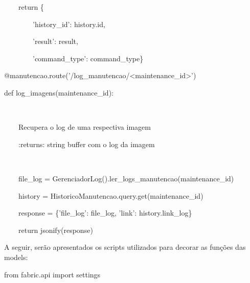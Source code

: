 {\ttfamily\color[rgb]{0.10980392,0.10980392,0.10980392}
    \ \ \ \ return \{}

{\ttfamily\color[rgb]{0.10980392,0.10980392,0.10980392}
    \ \ \ \ \ \ \ \ {}'history\_id': history.id,}

{\ttfamily\color[rgb]{0.10980392,0.10980392,0.10980392}
    \ \ \ \ \ \ \ \ {}'result': result,}

{\ttfamily\color[rgb]{0.10980392,0.10980392,0.10980392}
    \ \ \ \ \ \ \ \ {}'command\_type': command\_type\}}


    \bigskip


    \bigskip

{\ttfamily\color[rgb]{0.10980392,0.10980392,0.10980392}
    @manutencao.route('/log\_manutencao/{\textless}maintenance\_id{\textgreater}')}

{\ttfamily\color[rgb]{0.10980392,0.10980392,0.10980392}
    def log\_imagens(maintenance\_id):}

{\ttfamily\color[rgb]{0.10980392,0.10980392,0.10980392}
    \ \ \ \ {\textquotedbl}{\textquotedbl}{\textquotedbl}}

{\ttfamily\color[rgb]{0.10980392,0.10980392,0.10980392}
    \ \ \ \ Recupera o log de uma respectiva imagem}


    \bigskip

{\ttfamily\color[rgb]{0.10980392,0.10980392,0.10980392}
    \ \ \ \ :returns: string buffer com o log da imagem}

{\ttfamily\color[rgb]{0.10980392,0.10980392,0.10980392}
    \ \ \ \ {\textquotedbl}{\textquotedbl}{\textquotedbl}}

{\ttfamily\color[rgb]{0.10980392,0.10980392,0.10980392}
    \ \ \ \ file\_log = GerenciadorLog().ler\_logs\_manutencao(maintenance\_id)}

{\ttfamily\color[rgb]{0.10980392,0.10980392,0.10980392}
    \ \ \ \ history = HistoricoManutencao.query.get(maintenance\_id)}


    \bigskip

{\ttfamily\color[rgb]{0.10980392,0.10980392,0.10980392}
    \ \ \ \ response = \{'file\_log': file\_log, 'link': history.link\_log\}}

{\ttfamily\color[rgb]{0.10980392,0.10980392,0.10980392}
    \ \ \ \ return jsonify(response)}


    \bigskip

{\color{black}
    A seguir, ser\~ao apresentados os scripts utilizados para decorar as fun\c{c}\~oes das models:}

{\ttfamily\color[rgb]{0.10980392,0.10980392,0.10980392}
    from fabric.api import settings}

